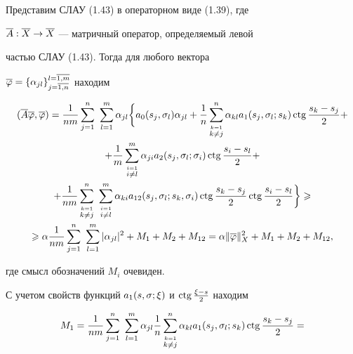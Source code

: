 \begin{pf}


Представим СЛАУ (1.43) в операторном виде (1.39), где 


$\overline{A}:\overline{X}\to \overline{X}$ --- матричный оператор, определяемый левой 


частью СЛАУ (1.43). Тогда для любого вектора 


$\overline{\varphi}=\{\alpha_{jl}\}_{j=\overline{1,n}}^{l=\overline{1,m}}$ находим


\begin{multline}


(\ol{A}\ol{\vp},\ol{\vp}) = \frac{1}{nm}\sum_{j=1}^n\ \sum_{l=1}^m


\alpha_{jl}\bigg\{a_0(s_j,\si_l)\alpha_{jl}+


\frac{1}{n}\sum_{\overset{k=1}{k\ne j}}^n \alpha_{kl}a_1(s_j,\si_l;s_k)\ctg


\frac{s_k-s_j}{2}+\\ 


%


+\frac{1}{m}\sum_{\overset{i=1}{i\ne l}}^m\alpha_{ji}


a_2 (s_j,\si_l;\si_i)\ctg\frac{s_i-s_l}{2}+ \\


%


+


\frac{1}{nm}\sum_{\overset{k=1}{k\ne j}}^n


\ \sum_{\overset{i=1}{i\ne l}}^m


\alpha_{ki}a_{12}(s_j,\si_l;s_k,\si_i)\ctg\frac{s_k-s_j}{2}


\ctg\frac{s_i-s_l}{2}\bigg\}\gea \\


%


\gea\alpha\frac{1}{nm}\sum_{j=1}^n\ \sum_{l=1}^m|\alpha_{jl}|^2+M_1+M_2+M_{12} = 


\alpha\|\ol{\vp}\|^2_X+M_1+M_2+M_{12},


\end{multline}


где смысл обозначений $M_i$ очевиден.


С учетом свойств функций $a_1(s,\sigma;\xi)$ и $\operatorname{ctg}\frac{\xi-s}{2}$ находим


\begin{multline}


M_1=\frac{1}{nm}\sum_{j=1}^n\ \sum_{l=1}^m \alpha_{jl}\frac{1}{n}


\suml_{\overset{k=1}{k\ne j}}^n\alpha_{kl}a_1(s_j,\si_l;s_k)


\ctg\frac{s_k-s_j}{2} = \\



\end{multline}
\end{pf}
